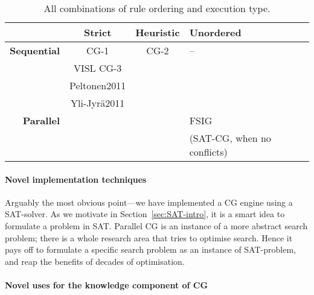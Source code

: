 \begin{table}[h]
\centering

  \begin{tabular}{r | c | c |@{~~...~}| p{3cm}}
           & \textbf{Strict} & \textbf{Heuristic} & \textbf{Unordered} \\ \hline
\textbf{Sequential}
           & CG-1            & CG-2  %
           							              & --           \\ 
           & VISL CG-3       \\ 
           & Peltonen2011    \\ %
           & Yli-Jyrä2011    \\ \hline
\textbf{Parallel}
		   & \satcgOrd       & \satcgMax          & FSIG \\ 
		   &                 &                    & (SAT-CG, 
		   											when no conflicts) \\
  \end{tabular}
  \label{table:nelikentta}
  \caption{All combinations of rule ordering and execution type. }
\end{table}

\paragraph{Novel implementation techniques} Arguably the most obvious point---we have implemented a CG engine using a SAT-solver. 
As we motivate in Section~\ref{sec:SAT-intro}, it is a smart idea to formulate a problem in SAT. 
Parallel CG is an instance of a more abstract search problem; there is a whole research area that tries to optimise search. Hence it pays off to formulate a specific search problem as an instance of SAT-problem, and reap the benefits of decades of optimisation.

\paragraph{Novel uses for the knowledge component of CG} 


